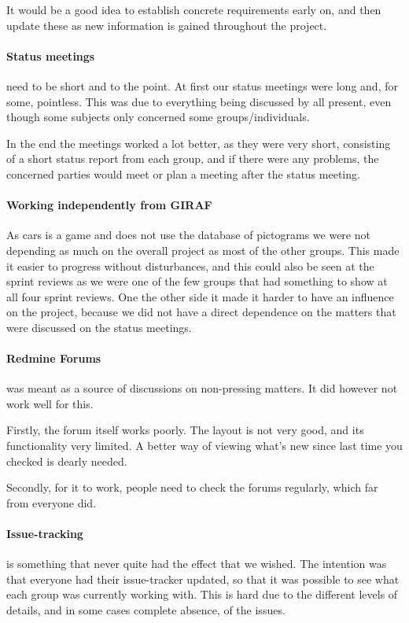 It would be a good idea to establish concrete requirements early on, and then update these as new information is gained throughout the project.

\paragraph{Status meetings} need to be short and to the point.
At first our status meetings were long and, for some, pointless.
This was due to everything being discussed by all present, even though some subjects only concerned some groups/individuals.

In the end the meetings worked a lot better, as they were very short, consisting of a short status report from each group, and if there were any problems, the concerned parties would meet or plan a meeting after the status meeting.

\paragraph{Working independently from GIRAF}
As cars is a game and does not use the database of pictograms we were not depending as much on the overall project as most of the other groups.
This made it easier to progress without disturbances, and this could also be seen at the sprint reviews as we were one of the few groups that had something to show at all four sprint reviews.
One the other side it made it harder to have an influence on the project, because we did not have a direct dependence on the matters that were discussed on the status meetings.

\paragraph{Redmine Forums} was meant as a source of discussions on non-pressing matters.
It did however not work well for this.

Firstly, the forum itself works poorly.
The layout is not very good, and its functionality very limited.
A better way of viewing what's new since last time you checked is dearly needed.

Secondly, for it to work, people need to check the forums regularly, which far from everyone did.

\paragraph{Issue-tracking} is something that never quite had the effect that we wished.
The intention was that everyone had their issue-tracker updated, so that it was possible to see what each group was currently working with.
This is hard due to the different levels of details, and in some cases complete absence, of the issues.

